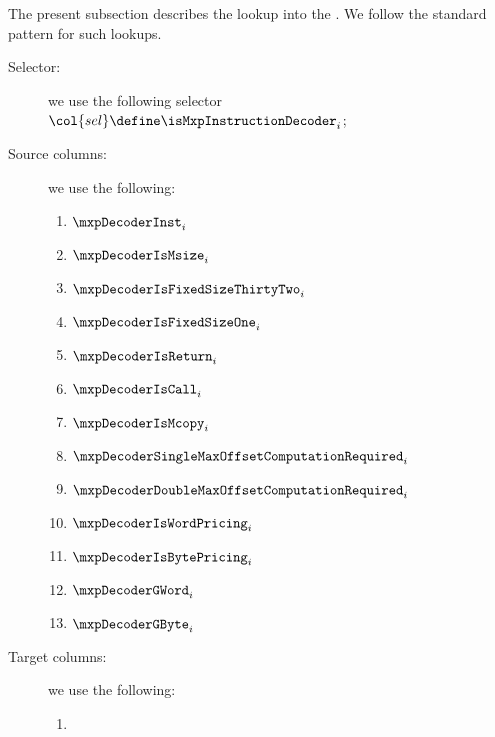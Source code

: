 The present subsection describes the lookup into the \idMod{}.
We follow the standard pattern for such lookups.
\begin{description}
	\item[Selector:] we use the following selector $\col{sel} \define \isMxpInstructionDecoder _{i}$;
	\item[Source columns:] we use the following:
		\begin{enumerate}
			\item $\mxpDecoderInst                               _{i}$
			\item $\mxpDecoderIsMsize                            _{i}$
			\item $\mxpDecoderIsFixedSizeThirtyTwo               _{i}$
			\item $\mxpDecoderIsFixedSizeOne                     _{i}$
			\item $\mxpDecoderIsReturn                           _{i}$
			\item $\mxpDecoderIsCall                             _{i}$
			\item $\mxpDecoderIsMcopy                            _{i}$
			\item $\mxpDecoderSingleMaxOffsetComputationRequired _{i}$
			\item $\mxpDecoderDoubleMaxOffsetComputationRequired _{i}$
			\item $\mxpDecoderIsWordPricing                      _{i}$
			\item $\mxpDecoderIsBytePricing                      _{i}$
			\item $\mxpDecoderGWord                              _{i}$
			\item $\mxpDecoderGByte                              _{i}$
		\end{enumerate}
	\item[Target columns:] we use the following:
		\begin{multicols}{2}
			\begin{enumerate}
				\item \specTodo{}
			\end{enumerate}
		\end{multicols}
\end{description}

